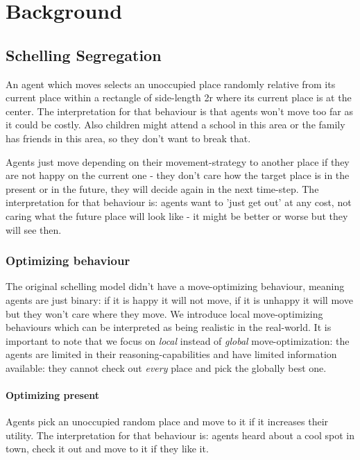 \section{Background}

\subsection{Schelling Segregation}
\cite{schelling_dynamic_1971}

An agent which moves selects an unoccupied place randomly relative from its current place within a rectangle of side-length 2r where its current place is at the center. The interpretation for that behaviour is that agents won't move too far as it could be costly. Also children might attend a school in this area or the family has friends in this area, so they don't want to break that.

Agents just move depending on their movement-strategy to another place if they are not happy on the current one - they don't care how the target place is in the present or in the future, they will decide again in the next time-step. The interpretation for that behaviour is: agents want to 'just get out' at any cost, not caring what the future place will look like - it might be better or worse but they will see then.


\subsubsection{Optimizing behaviour}
The original schelling model didn't have a move-optimizing behaviour, meaning agents are just binary: if it is happy it will not move, if it is unhappy it will move but they won't care where they move. We introduce local move-optimizing behaviours which can be interpreted as being realistic in the real-world. It is important to note that we focus on \textit{local} instead of \textit{global} move-optimization: the agents are limited in their reasoning-capabilities and have limited information available: they cannot check out \textit{every} place and pick the globally best one.

\paragraph{Optimizing present} Agents pick an unoccupied random place and move to it if it increases their utility. The interpretation for that behaviour is: agents heard about a cool spot in town, check it out and move to it if they like it.

